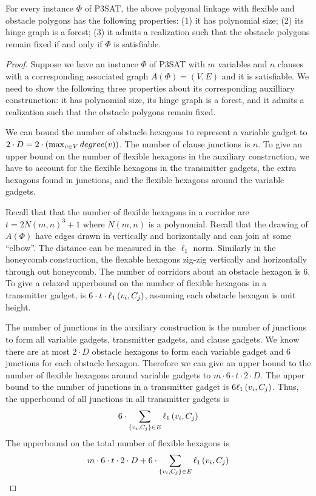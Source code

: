 \begin{lem}\label{lem:aux}
For every instance $\Phi$ of P3SAT, the above polygonal linkage with flexible and obstacle polygons has the following properties: (1) it has polynomial size; (2) its hinge graph is a forest;
(3) it admits a realization such that the obstacle polygons remain fixed if and only if $\Phi$ is satisfiable.
\end{lem}
\begin{proof}

Suppose we have an instance $\Phi$ of P3SAT with $m$ variables and $n$ clauses with a corresponding associated graph $A(\Phi)=(V,E)$ and it is satisfiable.  
We need to show the following three properties about its corresponding auxilliary construnction: it has polynomial size, its hinge graph is a forest, and it admits a realization such that the obstacle polygons remain fixed.

We can bound the number of obstacle hexagons to represent a variable gadget to $2 \cdot D = 2 \cdot \left(  \max_{v \in V} degree(v) \right)$.  
The number of clause junctions is $n$.
To give an upper bound on the number of flexible hexagons in the auxiliary construction, we have to account for the flexible hexagons in the transmitter gadgets, the extra hexagons found in junctions, and the flexible hexagons around the variable gadgets.

Recall that that the number of flexible hexagons in a corridor are $ t = 2N(m,n)^3 + 1 $ where $N(m,n)$ is a polynomial. 
Recall that the drawing of $A(\Phi)$ have edges drawn in vertically and horizontally and can join at some ``elbow''.  
The distance can be measured in the $\ell_1$ norm.
Similarly in the honeycomb construction, the flexable hexagons zig-zig vertically and horizontally through out honeycomb.  
The number of corridors about an obstacle hexagon is $6$.
To give a relaxed upperbound on the number of flexible hexagons in a transmitter gadget, is $6 \cdot t \cdot \ell_1\left( v_i,C_j \right)$, assuming each obstacle hexagon is unit height.

The number of junctions in the auxiliary construction is the number of junctions to form all variable gadgets, transmitter gadgets, and clause gadgets. 
We know there are at most $2 \cdot D$ obstacle hexagons to form each variable gadget and $6$ junctions for each obstacle hexagon.  
Therefore we can give an upper bound to the number of flexible hexagons around variable gadgets to $m \cdot 6 \cdot t \cdot 2 \cdot D$.
The upper bound to the number of junctions in a transmitter gadget is $6 \ell_1 \left( v_i, C_j \right)$.  
Thus, the upperbound of all junctions in all transmitter gadgets is $$6 \cdot \sum_{\left\lbrace v_i, C_j \right\rbrace \in E} \ell_1 \left( v_i, C_j \right)$$
The upperbound on the total number of flexible hexagons is
$$m \cdot 6 \cdot t \cdot 2 \cdot D + 6 \cdot \sum_{\left\lbrace v_i, C_j \right\rbrace \in E} \ell_1 \left( v_i, C_j \right)$$


\end{proof}
